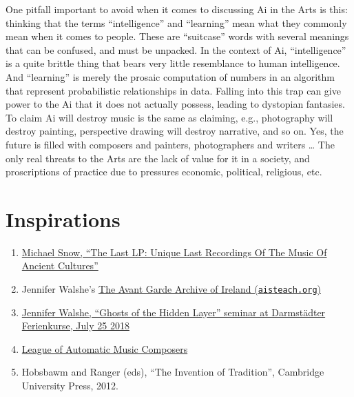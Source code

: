 \documentclass[a4paper,notitlepage,twoside]{book}
\begin{document}
One pitfall important to avoid when it comes to discussing Ai in the Arts is this: 
thinking that the terms “intelligence” and “learning” mean what they commonly mean when it comes to people. These are “suitcase” words with several meanings that can be confused, and must be unpacked. In the context of Ai, “intelligence” is a quite brittle thing that bears very little resemblance to human intelligence. And “learning” is merely the prosaic computation of numbers in an algorithm that represent probabilistic relationships in data. Falling into this trap can give power to the Ai that it does not actually possess,
leading to dystopian fantasies.
To claim Ai will destroy music is the same as claiming, e.g., photography will destroy painting, perspective drawing will destroy narrative, and so on. Yes, the future is filled with composers and painters, photographers and writers … The only real threats to the Arts are the lack of value for it in a society, and proscriptions of practice due to pressures economic, political, religious, etc.



\section{Inspirations}
\begin{enumerate}
\item \href{https://www.soundohm.com/product/the-last-lp}{Michael Snow, ``The Last LP: Unique Last Recordings Of The Music Of Ancient Cultures''}
\item Jennifer Walshe's \href{http://www.aisteach.org/}{The Avant Garde Archive of Ireland ({\tt aisteach.org})}
\item \href{http://milker.org/ghosts-of-the-hidden-layer}{Jennifer Walshe, ``Ghosts of the Hidden Layer''
seminar at Darmstädter Ferienkurse, July 25 2018}
\item \href{http://www.dramonline.org/labels/league-of-automatic-music-composers}{League of Automatic Music Composers}
\item Hobsbawm and Ranger (eds), ``The Invention of Tradition'', Cambridge University Press, 2012.
\end{enumerate}
\end{document}
